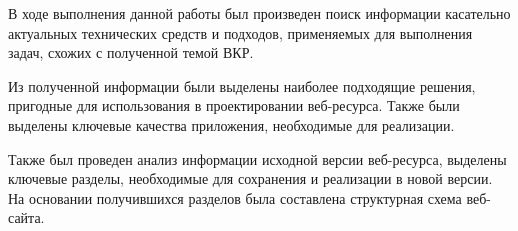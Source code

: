 \clearpage
{}

В ходе выполнения данной работы был произведен поиск информации касательно актуальных технических средств и подходов, применяемых для выполнения задач, схожих с полученной темой ВКР.

Из полученной информации были выделены наиболее подходящие решения, пригодные для использования в проектировании веб-ресурса.
Также были выделены ключевые качества приложения, необходимые для реализации.

Также был проведен анализ информации исходной версии веб-ресурса, выделены ключевые разделы, необходимые для сохранения и реализации в новой версии.
На основании получившихся разделов была составлена структурная схема веб-сайта.
\clearpage
